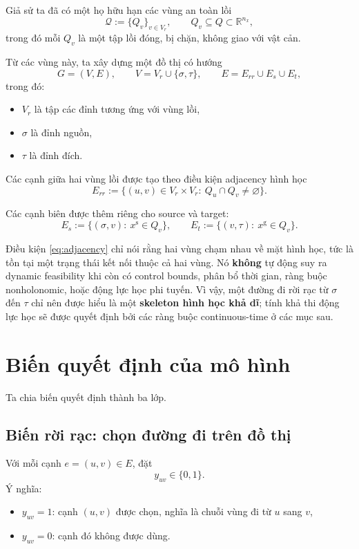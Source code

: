 \documentclass[12pt]{article}
\begin{document}
Giả sử ta đã có một họ hữu hạn các vùng an toàn lồi
\[
\mathcal Q:=\{Q_v\}_{v\in V_r},
\qquad
Q_v\subseteq Q \subset \mathbb R^{n_x},
\]
trong đó mỗi $Q_v$ là một tập lồi đóng, bị chặn, không giao với vật cản.

Từ các vùng này, ta xây dựng một đồ thị có hướng
\[
G=(V,E),
\qquad
V=V_r\cup\{\sigma,\tau\},
\qquad
E=E_{rr}\cup E_s\cup E_t,
\]
trong đó:
\begin{itemize}
    \item $V_r$ là tập các đỉnh tương ứng với vùng lồi,
    \item $\sigma$ là đỉnh nguồn,
    \item $\tau$ là đỉnh đích.
\end{itemize}

Các cạnh giữa hai vùng lồi được tạo theo điều kiện adjacency hình học
\begin{equation}
E_{rr}:=\{(u,v)\in V_r\times V_r:\ Q_u\cap Q_v\neq \varnothing\}.
\label{eq:adjacency}
\end{equation}

Các cạnh biên được thêm riêng cho source và target:
\begin{equation}
E_s:=\{(\sigma,v):\ x^{\mathrm s}\in Q_v\},
\qquad
E_t:=\{(v,\tau):\ x^{\mathrm g}\in Q_v\}.
\label{eq:boundary_edges}
\end{equation}

Điều kiện \eqref{eq:adjacency} chỉ nói rằng hai vùng chạm nhau về mặt hình học, tức là tồn tại một trạng thái kết nối thuộc cả hai vùng. Nó \textbf{không} tự động suy ra dynamic feasibility khi còn có control bounds, phân bổ thời gian, ràng buộc nonholonomic, hoặc động lực học phi tuyến. Vì vậy, một đường đi rời rạc từ $\sigma$ đến $\tau$ chỉ nên được hiểu là một \textbf{skeleton hình học khả dĩ}; tính khả thi động lực học sẽ được quyết định bởi các ràng buộc continuous-time ở các mục sau.

\section{Biến quyết định của mô hình}

Ta chia biến quyết định thành ba lớp.

\subsection{Biến rời rạc: chọn đường đi trên đồ thị}

Với mỗi cạnh $e=(u,v)\in E$, đặt
\begin{equation}
y_{uv}\in\{0,1\}.
\label{eq:ydef}
\end{equation}
Ý nghĩa:
\begin{itemize}
    \item $y_{uv}=1$: cạnh $(u,v)$ được chọn, nghĩa là chuỗi vùng đi từ $u$ sang $v$,
    \item $y_{uv}=0$: cạnh đó không được dùng.
\end{itemize}
\end{document}
